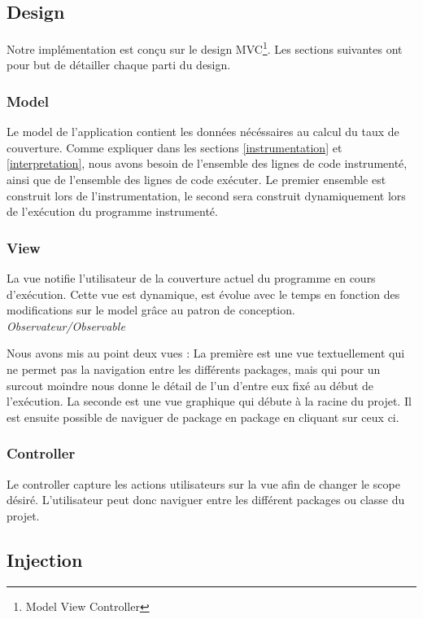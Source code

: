 \subsection{Design}

Notre implémentation est conçu sur le design MVC\footnote{Model View Controller}. Les sections suivantes ont pour but de détailler chaque parti du design.

\subsubsection{Model}

Le model de l'application contient les données nécéssaires au calcul du taux de couverture. Comme expliquer dans les sections \ref{instrumentation} et \ref{interpretation}, nous avons besoin de l'ensemble des lignes de code instrumenté, ainsi que de l'ensemble des lignes de code exécuter. Le premier ensemble est construit lors de l'instrumentation, le second sera construit dynamiquement lors de l'exécution du programme instrumenté.

\subsubsection{View}

La vue notifie l'utilisateur de la couverture actuel du programme en cours d'exécution. Cette vue est dynamique, est évolue avec le temps en fonction des modifications sur le model grâce au patron de conception. \textit{Observateur/Observable}
\\
\par Nous avons mis au point deux vues :
La première est une vue textuellement qui ne permet pas la navigation entre les différents packages, mais qui pour un surcout moindre nous donne le détail de l'un d'entre eux fixé au début de l'exécution.
La seconde est une vue graphique qui débute à la racine du projet. Il est ensuite possible de naviguer de package en package en cliquant sur ceux ci.

\subsubsection{Controller}

Le controller capture les actions utilisateurs sur la vue afin de changer le scope désiré. L'utilisateur peut donc naviguer entre les différent packages ou classe du projet.

\subsection{Injection}

